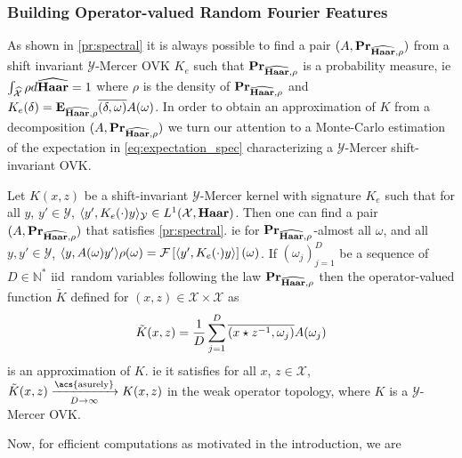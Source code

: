 \documentclass[twoside,11pt]{article}
\begin{document}
\subsubsection{Building Operator-valued Random Fourier Features}
As shown in \cref{pr:spectral} it is
always possible to find a pair $(A, {\mathbf{{Pr}}}_{\widehat{\mathbf{Haar}},\rho})$ from a
shift invariant $\mathcal{Y}$-Mercer \acl{OVK} $K_e$ such that
${\mathbf{{Pr}}}_{\widehat{\mathbf{Haar}},\rho}$ is a probability measure, \acs{ie}
$\int_{\widehat{\mathcal{X}}} \rho d\widehat{\mathbf{Haar}}=1$ where $\rho$ is the density of
${\mathbf{{Pr}}}_{\widehat{\mathbf{Haar}},\rho}$ and
$K_e(\delta)={\mathbf{{E}}}_{\widehat{\mathbf{Haar}},
\rho}{\overline{(\delta,\omega)}A(\omega)}$. In order to obtain an
approximation of $K$ from a decomposition $(A,
{\mathbf{{Pr}}}_{\widehat{\mathbf{Haar}},\rho})$ we turn our attention to a Monte-Carlo
estimation of the expectation in \cref{eq:expectation_spec} characterizing a
$\mathcal{Y}$-Mercer shift-invariant \acl{OVK}. %
\begin{proposition}
    \label{cr:ORFF-kernel} Let $K(x,z)$ be a shift-invariant
    $\mathcal{Y}$-Mercer kernel with signature $K_e$ such that for all $y$,
    $y'\in\mathcal{Y}$, $\langle y', K_e(\cdot)y\rangle_{\mathcal{Y}}\in
    L^1(\mathcal{X},\mathbf{Haar})$.  Then one can find a pair $(A,
    {\mathbf{{Pr}}}_{\widehat{\mathbf{Haar}},\rho})$ that satisfies \cref{pr:spectral}.
    \acs{ie} for ${\mathbf{{Pr}}}_{\widehat{\mathbf{Haar}},\rho}$-almost all $\omega$, and
    all $y, y'\in\mathcal{Y}$, $\langle y,
    A(\omega)y'\rangle\rho(\omega)=\mathcal{F}\left[\langle y', K_e(\cdot)y\rangle\right](\omega)$.  If
    $(\omega_j)_{j=1}^D$ be a sequence of $D\in\mathbb{N}^*$ \acs{iid}~random
    variables following the law ${\mathbf{{Pr}}}_{\widehat{\mathbf{Haar}},\rho}$ then the
    operator-valued function $\tilde{K}$ defined for $(x,z) \in
    \mathcal{X}\times \mathcal{X}$ as
    \begin{dmath*}
        \tilde{K}(x,z)= \frac{1}{D} \sum_{j=1}^D
        \conj{\pairing{x\groupop\inv{z},\omega_j}} A(\omega_j)
    \end{dmath*}
    is an approximation of $K$. \acs{ie} it satisfies for all $x$,
    $z\in\mathcal{X}$, $\tilde{K}(x, z) \converges{\acs{asurely}}{D\to\infty}
    K(x, z)$ in the weak operator topology, where $K$ is a $\mathcal{Y}$-Mercer
    \acs{OVK}.
\end{proposition}
Now, for efficient computations as motivated in the introduction, we are
\end{document}
